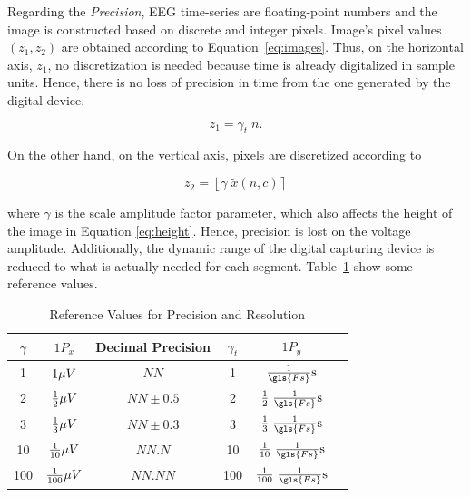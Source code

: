 Regarding the \textit{Precision}, EEG time-series are floating-point numbers and the image is constructed based on discrete and integer pixels.  Image's pixel values $(z_1,z_2)$ are obtained according to Equation~\ref{eq:images}.  Thus, on the horizontal axis, $z_1$, no discretization is needed because time is already digitalized in sample units. Hence, there is no loss of precision in time from the one generated by the digital device.

\begin{equation}
z_1 = \gamma_t  \; n.
\label{eq:horizontalpixelation}
\end{equation}

On the other hand, on the vertical axis, pixels are discretized according to

\begin{equation}
z_2 = \left \lfloor{ \gamma  \; \tilde{x}(n,c)  }\right \rceil
\label{eq:verticalpixelation}
\end{equation}

\noindent where $\gamma$ is the scale amplitude factor parameter, which also affects the height of the image in Equation \ref{eq:height}.  Hence, precision is lost on the voltage amplitude. Additionally, the dynamic range of the digital capturing device is reduced to what is actually needed for each segment.  Table~\ref{tab:precision} show some reference values.

\begin{table}[htb]
\caption[Reference Values for Precision and Resolution]{Reference Values for Precision and Resolution}
\centering
\begin{tabular}{c|c|c||c|c|c}
\toprule
\textbf{$\gamma$}	&  $1 P_x$ 	&  Decimal Precision & \textbf{$\gamma_t$}	&  $1 P_y$  \\
\midrule
1     &     $1 \si\mu{V}$   &  $NN$                               & 1    &     $\frac{1}{\gls{Fs}} \si{s}$    \\
2    &     $\frac{1}{2} \si\mu{V}$   &  $NN \pm 0.5$  & 2    &     $\frac{1}{2} \; \frac{1}{\gls{Fs}} \si{s}$    \\
3     &     $\frac{1}{3} \si\mu{V}$   &  $NN\pm 0.3$  & 3    &     $\frac{1}{3} \;  \frac{1}{\gls{Fs}} \si{s}$    \\
10     &     $\frac{1}{10} \si\mu{V}$   &  $NN.N$        & 10   &     $\frac{1}{10} \; \frac{1}{\gls{Fs}} \si{s}$    \\
100     &     $\frac{1}{100} \si\mu{V}$   &  $NN.NN$ & 100 &     $\frac{1}{100} \; \frac{1}{\gls{Fs}} \si{s}$    \\
\bottomrule
\end{tabular}
\label{tab:precision}
\end{table}
